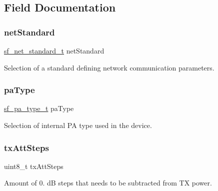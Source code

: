 \subsection{Field Documentation}
\mbox{\label{structsf__user__config__t_ab90aa96aca46c0b99f92de71ca11d792}} 
\subsubsection{\texorpdfstring{netStandard}{netStandard}}
{\footnotesize\ttfamily \mbox{\hyperlink{group__sf__enum__group_ga9ad07e4b666d7d70f7a69614ecb89421}{sf\+\_\+net\+\_\+standard\+\_\+t}} net\+Standard}

Selection of a standard defining network communication parameters. \mbox{\label{structsf__user__config__t_a690c474c8cd0d99898f711b187fbef43}} 
\subsubsection{\texorpdfstring{paType}{paType}}
{\footnotesize\ttfamily \mbox{\hyperlink{group__sf__enum__group_gac746e971077ef8c8dac9d26a8b47a2f9}{sf\+\_\+pa\+\_\+type\+\_\+t}} pa\+Type}

Selection of internal PA type used in the device. \mbox{\label{structsf__user__config__t_ab9629fb6d8a7c0cbe42b58030e087e94}} 
\subsubsection{\texorpdfstring{txAttSteps}{txAttSteps}}
{\footnotesize\ttfamily uint8\+\_\+t tx\+Att\+Steps}

Amount of 0. dB steps that needs to be subtracted from TX power. \mbox{\label{structsf__user__config__t_ac3c47b91470c93e7ddee7c38182cc50c}} 

